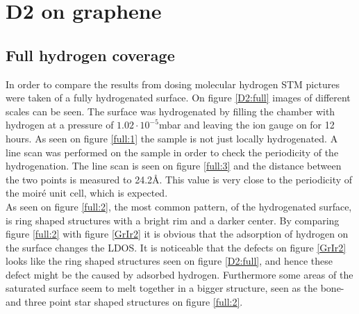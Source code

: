 \begin{figure}[H]
\caption{}
\label{GrIr}
\end{figure}

\section{D2 on graphene}

\subsection{Full hydrogen coverage}
In order to compare the results from dosing molecular hydrogen STM pictures were taken of a fully hydrogenated surface. On figure \ref{D2:full} images of different scales can be seen. The surface was hydrogenated by filling the chamber with hydrogen at a pressure of $1.02 \cdot 10^{-5}$mbar and leaving the ion gauge on for 12 hours. As seen on figure \ref{full:1} the sample is not just locally hydrogenated. A line scan was performed on the sample in order to check the periodicity of the hydrogenation. The line scan is seen on figure \ref{full:3} and the distance between the two points is measured to 24.2Å. This value is very close to the periodicity of the moiré unit cell, which is expected.\\
As seen on figure \ref{full:2}, the most common pattern, of the hydrogenated surface, is ring shaped structures with a bright rim and a darker center. By comparing figure \ref{full:2} with figure \ref{GrIr2} it is obvious that the adsorption of hydrogen on the surface changes the LDOS. It is noticeable that the defects on figure \ref{GrIr2} looks like the ring shaped structures seen on figure \ref{D2:full}, and hence these defect might be the caused by adsorbed hydrogen. Furthermore some areas of the saturated surface seem to melt together in a bigger structure, seen as the bone- and three point star shaped structures on figure \ref{full:2}.

